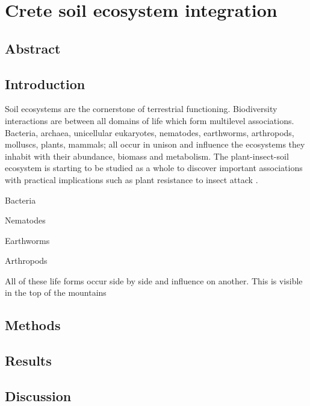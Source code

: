 % 
% 


\chapter{Crete soil ecosystem integration}
\label{cha:crete-soil}




\section{Abstract}

\section{Introduction}
\label{sec:crete-soil-intro}

Soil ecosystems are the cornerstone of terrestrial functioning.
Biodiversity interactions are between all domains of life which form
multilevel associations. Bacteria, archaea, unicellular eukaryotes, nematodes,
earthworms, arthropods, molluscs, plants, mammals; all occur in unison and 
influence the ecosystems they inhabit with their abundance, biomass \citep{bar2018biomass} and metabolism.
The plant-insect-soil ecosystem is starting to be studied as a whole to discover
important associations with practical implications such as plant resistance 
to insect attack \citep{plant-insect-soil2023}.


Bacteria \citep{Delgado-Baquerizo-atlas}

Nematodes \citep{vandenHoogen2019}

Earthworms \citep{Phillips2021}

Arthropods \citep{milo-arthropods}

All of these life forms occur side by side and influence on another. This is visible in the 
top of the mountains \citep{winkler2018side}

\section{Methods}
\label{sec:crete-soil-method}

\section{Results}
\label{sec:crete-soil-results}

\section{Discussion}
\label{sec:crete-soil-discussion}

% 
